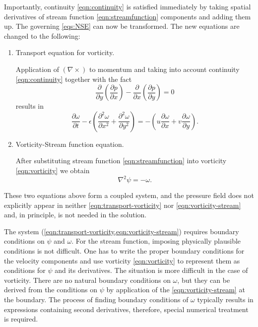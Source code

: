 \documentclass{article}
\numberwithin{equation}{section}
\begin{document}
	Importantly, continuity \cref{eqn:continuity} is satisfied immediately by taking spatial derivatives of stream function \cref{eqn:streamfunction} components and adding them up. The governing \cref{eqs:NSE} can now be transformed. The new equations are changed to the following:
	\begin{enumerate}
		\item 
			Transport equation for vorticity.
			
			Application of $(\nabla \times)$ to momentum and taking into account continuity \cref{eqn:continuity} together with the fact
			\begin{equation*}
				\frac{\partial}{\partial y}\left(\frac{\partial p}{\partial x}\right) - 
				\frac{\partial}{\partial x}\left(\frac{\partial p}{\partial y}\right)=0
			\end{equation*}
			results in
			\begin{equation}
			\label{eqn:transport-vorticity}
				\boxed{
				\frac{\partial\omega}{\partial t} -\epsilon \left(\frac{\partial ^2 \omega}{\partial x^2} 
				+ \frac{\partial^2 \omega}{\partial y^2} \right)
				=-\left( u \frac{\partial\omega}{\partial x} 
				+ v\frac{\partial\omega}{\partial y}\right).
				}
			\end{equation}
			
		\item 
		Vorticity-Stream function equation.
		
		After substituting stream function \cref{eqn:streamfunction} into vorticity \cref{eqn:vorticity} we obtain
		\begin{equation}
			\label{eqn:vorticity-stream}
			\boxed{\nabla ^2 \psi = -\omega.}
		\end{equation}	
	\end{enumerate}
	
	These two equations above form a coupled system, and the pressure field does not explicitly appear in neither \cref{eqn:transport-vorticity} nor \cref{eqn:vorticity-stream} and, in principle, is not needed in the solution.
	
	The system (\cref{eqn:transport-vorticity,eqn:vorticity-stream}) requires boundary conditions on $\psi$ and $\omega$. For the stream function, imposing physically plausible conditions is not difficult. One has to write the proper boundary conditions for the velocity components and use vorticity \cref{eqn:vorticity} to represent them as conditions for $\psi$ and its derivatives. The situation is more difficult in the case of vorticity. There are no natural boundary conditions on $\omega$, but they can be derived from the conditions on $\psi$ by application of the \cref{eqn:vorticity-stream} at the boundary. The process of finding boundary conditions of $\omega$ typically results in expressions containing second derivatives, therefore, special numerical treatment is required.
\end{document}
